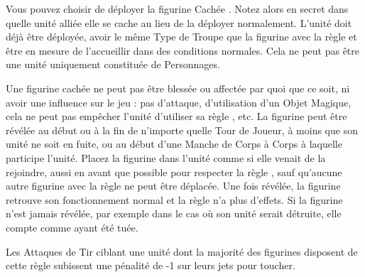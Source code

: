 


Vous pouvez choisir de déployer la figurine \og Cachée \fg{}. Notez alors en secret dans quelle unité alliée elle se cache au lieu de la déployer normalement. L'unité doit déjà être déployée, avoir le même Type de Troupe que la figurine avec la règle \hidden{} et être en mesure de l'accueillir dans des conditions normales. Cela ne peut pas être une unité uniquement constituée de Personnages.

Une figurine cachée ne peut pas être blessée ou affectée par quoi que ce soit, ni avoir une influence sur le jeu : pas d'attaque, d'utilisation d'un Objet Magique, cela ne peut pas empêcher l'unité d'utiliser sa règle \vanguard{}, etc. La figurine peut être révélée au début ou à la fin de n'importe quelle Tour de Joueur, à moins que son unité ne soit en fuite, ou au début d'une Manche de Corps à Corps à laquelle participe l'unité. Placez la figurine dans l'unité comme si elle venait de la rejoindre, aussi en avant que possible pour respecter la règle \frontrank{}, sauf qu'aucune autre figurine avec la règle \frontrank{} ne peut être déplacée. Une fois révélée, la figurine retrouve son fonctionnement normal et la règle n'a plus d'effets. Si la figurine n'est jamais révélée, par exemple dans le cas où son unité serait détruite, elle compte comme ayant été tuée.


Les Attaques de Tir ciblant une unité dont la majorité des figurines disposent de cette règle subissent une pénalité de -1 sur leurs jets pour toucher.

\label{channel_special_rule}


